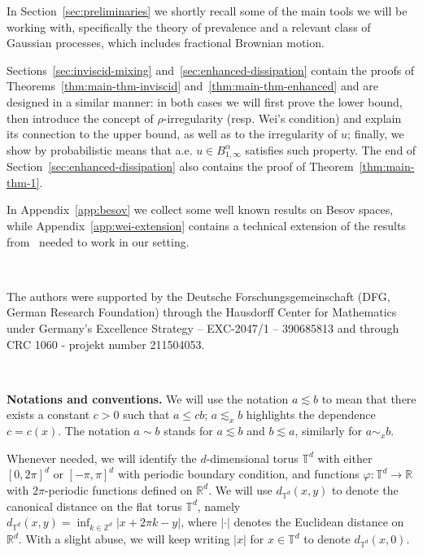 \documentclass[11pt,oneside,reqno]{amsart}
\newcommand{\tmstrong}[1]{\textbf{#1}}
\newcommand{\tmtextbf}[1]{\text{{\bfseries{#1}}}}
\numberwithin{equation}{section}
\begin{document}
\tmtextbf{Structure of the paper.} In Section~\ref{sec:preliminaries} we
shortly recall some of the main tools we will be working with, specifically
the theory of prevalence and a relevant class of Gaussian
processes, which includes fractional Brownian motion.

Sections~\ref{sec:inviscid-mixing} and~\ref{sec:enhanced-dissipation} contain
the proofs of Theorems~\ref{thm:main-thm-inviscid}
and~\ref{thm:main-thm-enhanced} and are designed in a similar manner: in both
cases we will first prove the lower bound, then introduce the concept of
$\rho$-irregularity (resp. Wei's condition) and explain its connection to the
upper bound, as well as to the irregularity of $u$; finally, we show by
probabilistic means that a.e. $u \in B^{\alpha}_{1, \infty}$ satisfies such
property. The end of Section~\ref{sec:enhanced-dissipation} also contains the
proof of Theorem~\ref{thm:main-thm-1}.

In Appendix~\ref{app:besov} we collect some well known results on Besov
spaces, while Appendix~\ref{app:wei-extension} contains a technical extension
of the results from~{\cite{wei}} needed to work in our setting.

\

\tmtextbf{Acknowledgments.} The authors were supported by the Deutsche
Forschungsgemeinschaft (DFG, German Research Foundation) through the Hausdorff
Center for Mathematics under Germany's Excellence Strategy -- EXC-2047/1 --
390685813 and through CRC 1060 - projekt number 211504053.

\

{\tmstrong{Notations and conventions.}} We will use the notation $a \lesssim
b$ to mean that there exists a constant $c > 0$ such that $a \leqslant c b$;
$a \lesssim_x b$ highlights the dependence $c = c (x)$. The notation $a \sim
b$ stands for $a \lesssim b$ and $b \lesssim a$, similarly for $a \sim_x b$.

Whenever needed, we will identify the $d$-dimensional torus $\mathbb{T}^d$
with either $[0, 2 \pi]^d$ or $[- \pi, \pi]^d$ with periodic boundary
condition, and functions $\varphi : \mathbb{T}^d \rightarrow \mathbb{R}$ with
$2 \pi$-periodic functions defined on $\mathbb{R}^d$. We will use
$d_{\mathbb{T}^d} (x, y)$ to denote the canonical distance on the flat torus
$\mathbb{T}^d$, namely $d_{\mathbb{T}^d} (x, y) = \inf_{k \in \mathbb{Z}^d} |
x + 2 \pi k - y |$, where $| \cdot |$ denotes the Euclidean distance on
$\mathbb{R}^d$. With a slight abuse, we will keep writing $| x |$ for $x \in
\mathbb{T}^d$ to denote $d_{\mathbb{T}^d} (x, 0)$.
\end{document}
